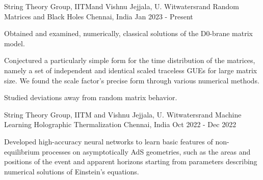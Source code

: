 



\begin{cventries}


  \cventry
    {String Theory Group, IITM\footnotemark[1] and Vishnu Jejjala, U. Witwatersrand} %
    {Random Matrices and Black Holes} %
    {Chennai, India} %
    {Jan 2023 - Present} %
    {
      \begin{cvitems} %
        \item {Obtained and examined, numerically, classical solutions of the D0-brane matrix model.}
        \item {Conjectured a particularly simple form for the time distribution of the matrices, namely a set of independent and identical scaled traceless GUEs for large matrix size. We found the scale factor's precise form through various numerical methods.}
        \item {Studied deviations away from random matrix behavior.}
      \end{cvitems}
    }

  \cventry
    {String Theory Group, IITM and Vishnu Jejjala, U. Witwatersrand} %
    {Machine Learning Holographic Thermalization} %
    {Chennai, India} %
    {Oct 2022 - Dec 2022} %
    {
      \begin{cvitems} %
        \item {Developed high-accuracy neural networks to learn basic features of non-equilibrium processes on asymptotically AdS geometries, such as the areas and positions of the event and apparent horizons starting from parameters describing numerical solutions of Einstein's equations.}
      \end{cvitems}
    }



\end{cventries}
